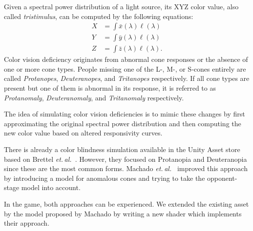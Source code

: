 \documentclass{sig-alternate-05-2015}
\newcommand{\etal}{\textit{et. al.}}
\begin{document}
Given a spectral power distribution of a light source, its XYZ color value, also called \emph{tristimulus}, can be computed by the following equations:
\begin{eqnarray}
    X &= \int\bar x(\lambda) \ell(\lambda) \\
    Y &= \int\bar y(\lambda) \ell(\lambda) \\
    Z &= \int\bar z(\lambda) \ell(\lambda).
\end{eqnarray}
%
Color vision deficiency originates from abnormal cone responses or the absence of one or more cone types.
People missing one of the L-, M-, or S-cones entirely are called \emph{Protanopes}, \emph{Deuteranopes}, and \emph{Tritanopes} respectively.
If all cone types are present but one of them is abnormal in its response, it is referred to as \emph{Protanomaly}, \emph{Deuteranomaly}, and \emph{Tritanomaly} respectively.

The idea of simulating color vision deficiencies is to mimic these changes by first approximating the original spectral power distribution and then computing the new color value based on altered responsivity curves.

There is already a color blindness simulation available in the Unity Asset store based on Brettel \etal~\cite{brettel}.
However, they focused on Protanopia and Deuteranopia since these are the most common forms.
Machado \etal~\cite{Machado2009} improved this approach by introducing a model for anomalous cones and trying to take the opponent-stage model into account.

In the game, both approaches can be experienced.
We extended the existing asset by the model proposed by Machado by writing a new shader which implements their approach.

\end{document}
